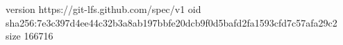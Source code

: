 version https://git-lfs.github.com/spec/v1
oid sha256:7e3c397d4ee44c32b3a8ab197bbfe20dcb9f0d5bafd2fa1593cfd7c57afa29c2
size 166716
